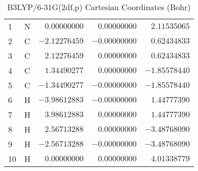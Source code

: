 \documentclass[10pt,oneside]{article}
\begin{document}
\begin{table}[h!]
\centering
\caption{B3LYP/6-31G(2df,p) Cartesian Coordinates (Bohr)}
\begin{tabular}{llrrr}
1  & N  & $ 0.00000000$ & $ 0.00000000$ & $ 2.11535065$ \\
2  & C  & $-2.12276459$ & $-0.00000000$ & $ 0.62434833$ \\
3  & C  & $ 2.12276459$ & $ 0.00000000$ & $ 0.62434833$ \\
4  & C  & $ 1.34490277$ & $ 0.00000000$ & $-1.85578440$ \\
5  & C  & $-1.34490277$ & $-0.00000000$ & $-1.85578440$ \\
6  & H  & $-3.98612883$ & $-0.00000000$ & $ 1.44777390$ \\
7  & H  & $ 3.98612883$ & $ 0.00000000$ & $ 1.44777390$ \\
8  & H  & $ 2.56713288$ & $ 0.00000000$ & $-3.48768090$ \\
9  & H  & $-2.56713288$ & $-0.00000000$ & $-3.48768090$ \\
10 & H  & $ 0.00000000$ & $ 0.00000000$ & $ 4.01338779$ \\
\end{tabular}
\end{table}

\clearpage
\end{document}
